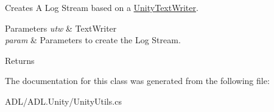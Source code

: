 Creates A Log Stream based on a \mbox{\hyperlink{class_a_d_l_1_1_unity_1_1_unity_text_writer}{Unity\+Text\+Writer}}. 


\begin{DoxyParams}{Parameters}
{\em utw} & Text\+Writer\\
\hline
{\em param} & Parameters to create the Log Stream.\\
\hline
\end{DoxyParams}
\begin{DoxyReturn}{Returns}

\end{DoxyReturn}


The documentation for this class was generated from the following file\+:\begin{DoxyCompactItemize}
\item 
A\+D\+L/\+A\+D\+L.\+Unity/Unity\+Utils.\+cs\end{DoxyCompactItemize}
